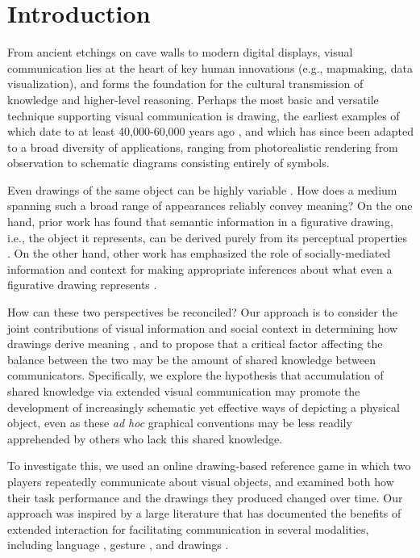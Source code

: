 \documentclass[10pt,letterpaper]{article}
\begin{document}
\section{Introduction}

From ancient etchings on cave walls to modern digital displays, visual communication lies at the heart of key human innovations (e.g., mapmaking, data visualization), and forms the foundation for the cultural transmission of knowledge and higher-level reasoning. 
Perhaps the most basic and versatile technique supporting visual communication is drawing, the earliest examples of which date to at least 40,000-60,000 years ago \cite{hoffmann2018u,Aubert:2014jy}, and which has since been adapted to a broad diversity of applications, ranging from photorealistic rendering from observation to schematic diagrams consisting entirely of symbols. 

Even drawings of the same object can be highly variable \cite{quickdraw2017}.
How does a medium spanning such a broad range of appearances reliably convey meaning? 
On the one hand, prior work has found that semantic information in a figurative drawing, i.e., the object it represents, can be derived purely from its perceptual properties \cite{FanCommon2018}. 
On the other hand, other work has emphasized the role of socially-mediated information and context for making appropriate inferences about what even a figurative drawing represents \cite{goodman1976languages,gombrich1969art}.

How can these two perspectives be reconciled? 
Our approach is to consider the joint contributions of visual information and social context in determining how drawings derive meaning \cite{fan2018modeling,abell2009canny}, and to propose that a critical factor affecting the balance between the two may be the amount of shared knowledge between communicators. 
Specifically, we explore the hypothesis that accumulation of shared knowledge via extended visual communication may promote the development of increasingly schematic yet effective ways of depicting a physical object, even as these \textit{ad hoc} graphical conventions may be less readily apprehended by others who lack this shared knowledge. 

To investigate this, we used an online drawing-based reference game in which two players repeatedly communicate about visual objects, and examined both how their task performance and the drawings they produced changed over time. 
Our approach was inspired by a large literature that has documented the benefits of extended interaction for facilitating communication in several modalities, including language \cite{ClarkWilkesGibbs86_ReferringCollaborative,HawkinsFrankGoodman17_ConventionFormation}, gesture \cite{goldin1996silence,fay2014creating}, and drawings \cite{garrod_foundations_2007,fay2010interactive}.
\end{document}
